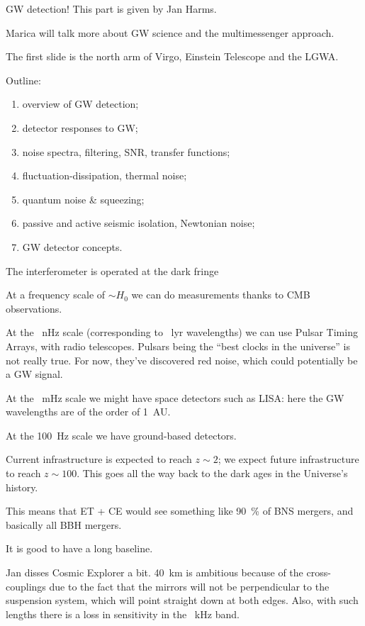 \documentclass[main.tex]{subfiles}
\begin{document}

GW detection! 
This part is given by Jan Harms. 

Marica will talk more about GW science and the multimessenger approach.

The first slide is the north arm of Virgo, Einstein Telescope and the LGWA. 

Outline: 
\begin{enumerate}
    \item overview of GW detection;
    \item detector responses to GW;
    \item noise spectra, filtering, SNR, transfer functions;
    \item fluctuation-dissipation, thermal noise;
    \item quantum noise \& squeezing;
    \item passive and active seismic isolation, Newtonian noise;
    \item GW detector concepts.
\end{enumerate}

The interferometer is operated at the dark fringe

At a frequency scale of \(\sim H_0 \) we can do measurements thanks to CMB observations. 

At the \SI{}{nHz} scale (corresponding to \SI{}{lyr} wavelengths) we can use Pulsar Timing Arrays,
with radio telescopes.
Pulsars being the ``best clocks in the universe'' is not really true. 
For now, they've discovered red noise, which could potentially be a GW signal. 

At the \SI{}{mHz} scale we might have space detectors such as LISA: 
here the GW wavelengths are of the order of \SI{1}{AU}. 

At the \SI{100}{Hz} scale we have ground-based detectors. 

Current infrastructure is expected to reach \(z \sim 2\); we expect future infrastructure
to reach \(z \sim 100\). 
This goes all the way back to the dark ages in the Universe's history.

This means that ET + CE would see something like \SI{90}{\percent} of BNS mergers, and 
basically all BBH mergers. 

It is good to have a long baseline. 

Jan disses Cosmic Explorer a bit. \SI{40}{km} is ambitious because of the 
cross-couplings due to the fact that the mirrors will not be perpendicular 
to the suspension system, which will point straight down at both edges. 
Also, with such lengths there is a loss in sensitivity in the \SI{}{kHz} band. 
\end{document}
